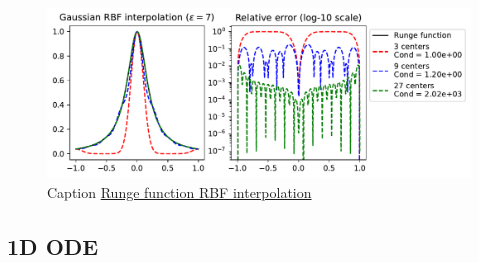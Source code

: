 \documentclass[12pt]{report} %
\begin{document}
\begin{figure}[ht]
  \centering
  \includegraphics[width=\textwidth]{imagenes/rbf_interpolation/rbf_runge_7.pdf}
  \caption{Caption \href{https://github.com/heqro/tfm-experiments/blob/main/introductory_notebooks/rbf_interpolation/runge_phs.ipynb}{Runge function RBF interpolation}}
  \label{fig:rbf-runge-phenomenon-eps-7}
\end{figure}



\subsection*{1D ODE}






\end{document}
